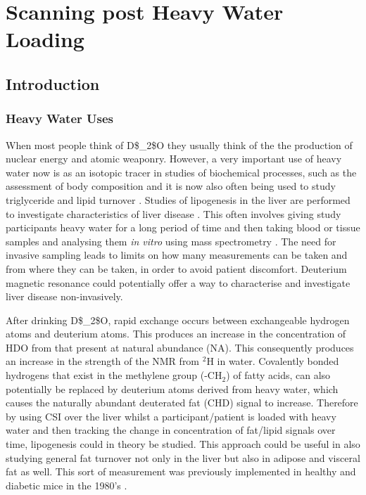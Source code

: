 \chapter{Scanning post Heavy Water Loading}
\label{Chap:D2O}

\section{Introduction}

\subsection{Heavy Water Uses}

When most people think of \ac{D$_2$O} they usually think of the the production of nuclear energy and atomic weaponry. However, a very important use of heavy water now is as an isotopic tracer in studies of biochemical processes, such as the assessment of body composition \cite{INTERNATIONALATOMICENERGYAGENCY2011IntroductionSpectrometry} and it is now also often being used to study triglyceride \cite{Strawford2004AdiposeO} and lipid turnover \cite{Wilkinson2017StableFuture}. Studies of lipogenesis in the liver are performed to investigate characteristics of liver disease \cite{Turner2003MeasurementMIDA}. This often involves giving study participants heavy water for a long period of time and then taking blood or tissue samples and analysing them \textit{in vitro} using mass spectrometry \cite{Lawitz2022ElevatedPatients, Diraison1997MeasuringTechniques}. The need for invasive sampling leads to limits on how many measurements can be taken and from where they can be taken, in order to avoid patient discomfort. Deuterium magnetic resonance could potentially offer a way to characterise and investigate liver disease non-invasively. 

After drinking \ac{D$_2$O}, rapid exchange occurs between exchangeable hydrogen atoms and deuterium atoms. This produces an increase in the concentration of \ac{HDO} from that present at natural abundance (NA). This consequently produces an increase in the strength of the \ac{NMR} from $^2$H in water. Covalently bonded hydrogens that exist in the methylene group (-CH$_2$) of fatty acids, can also potentially be replaced by deuterium atoms derived from heavy water, which causes the naturally abundant deuterated fat (CHD) signal to increase. Therefore by using \ac{CSI} over the liver whilst a participant/patient is loaded with heavy water and then tracking the change in concentration of fat/lipid signals over time, lipogenesis could in theory be studied. This approach could be useful in also studying general fat turnover not only in the liver but also in adipose and visceral fat as well. This sort of measurement was previously implemented in healthy and diabetic mice in the 1980's \cite{Brereton1986PreliminarySpectroscopy,Brereton1989TheMice}.

